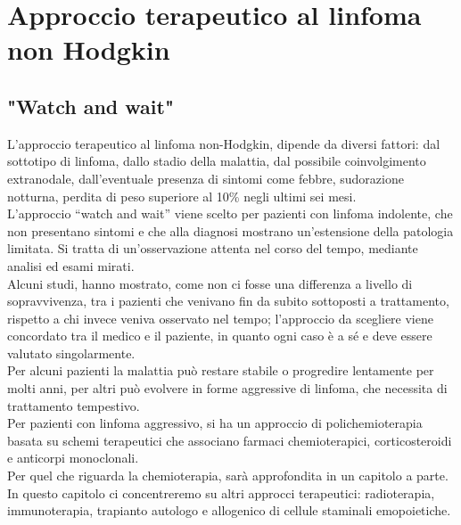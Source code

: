 \chapter{Approccio terapeutico al linfoma non Hodgkin}

\section{"Watch and wait"}
L’approccio terapeutico al linfoma non-Hodgkin, dipende da diversi fattori: dal sottotipo di linfoma, 
dallo stadio della malattia, dal possibile coinvolgimento extranodale, dall’eventuale presenza di sintomi come febbre, 
sudorazione notturna, perdita di peso superiore al 10\% negli ultimi sei mesi\cite{LLS}.\\
L’approccio “watch and wait” viene scelto per pazienti con linfoma indolente, che non presentano sintomi e che 
alla diagnosi mostrano un’estensione della patologia limitata. 
Si tratta di un’osservazione attenta nel corso del tempo, mediante analisi ed esami mirati.\\
Alcuni studi, hanno mostrato, come non ci fosse una differenza a livello di sopravvivenza, tra i pazienti che venivano 
fin da subito sottoposti a trattamento, rispetto a chi invece veniva osservato nel tempo; l’approccio da scegliere 
viene concordato tra il medico e il paziente, in quanto ogni caso è a sé e deve essere valutato singolarmente\cite{LLS}.\\
Per alcuni pazienti la malattia può restare stabile o progredire lentamente per molti anni, 
per altri può evolvere in forme aggressive di linfoma, che necessita di trattamento tempestivo.\\
Per pazienti con linfoma aggressivo, si ha un approccio di polichemioterapia basata su schemi terapeutici 
che associano farmaci chemioterapici, corticosteroidi e anticorpi monoclonali.\\ 
Per quel che riguarda la chemioterapia, sarà approfondita in un capitolo a parte.\\ 
In questo capitolo ci concentreremo su altri approcci terapeutici: 
radioterapia, immunoterapia, trapianto autologo e allogenico di cellule staminali emopoietiche.

